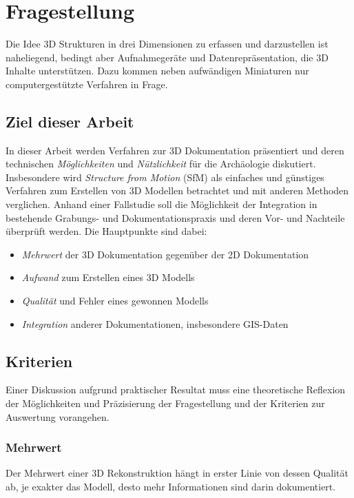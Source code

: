 \chapter{Fragestellung}
	Die Idee 3D Strukturen in drei Dimensionen zu erfassen und darzustellen ist naheliegend, bedingt aber Aufnahmegeräte und Datenrepräsentation, die 3D Inhalte unterstützen. Dazu kommen neben aufwändigen Miniaturen nur computergestützte Verfahren in Frage.
	
	\section{Ziel dieser Arbeit} \label{frag:ziel}
		In dieser Arbeit werden Verfahren zur 3D Dokumentation präsentiert und deren technischen \emph{Möglichkeiten} und \emph{Nützlichkeit} für die Archäologie diskutiert.
		Insbesondere wird \emph{Structure from Motion} (SfM) als einfaches und günstiges Verfahren zum Erstellen von 3D Modellen betrachtet und mit anderen Methoden verglichen.
		Anhand einer Fallstudie soll die Möglichkeit der Integration in bestehende Grabungs- und Dokumentationspraxis und deren Vor- und Nachteile überprüft werden.
		Die Hauptpunkte sind dabei:
		\begin{itemize}
			\item
			\emph{Mehrwert} der 3D Dokumentation gegenüber der 2D Dokumentation
			\item
			\emph{Aufwand} zum Erstellen eines 3D Modells
			\item
			\emph{Qualität} und Fehler eines gewonnen Modells
			\item
			\emph{Integration} anderer Dokumentationen, insbesondere GIS-Daten
		\end{itemize}
	
	\section{Kriterien} \label{frag:kriterien} %
		Einer Diskussion aufgrund praktischer Resultat muss eine theoretische Reflexion der Möglichkeiten und Präzisierung der Fragestellung und  der Kriterien zur Auswertung vorangehen.
		
		\subsection{Mehrwert}
			Der Mehrwert einer 3D Rekonstruktion hängt in erster Linie von dessen Qualität ab, je exakter das Modell, desto mehr Informationen sind darin dokumentiert.
			
